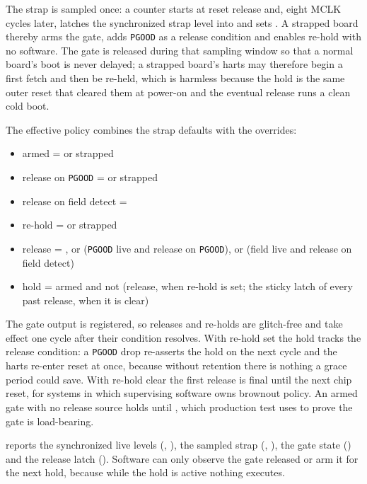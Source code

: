 The strap is sampled once: a counter starts at reset release and, eight MCLK cycles later, latches the synchronized strap level into  and sets . A strapped board thereby arms the gate, adds \texttt{PGOOD} as a release condition and enables re-hold with no software. The gate is released during that sampling window so that a normal board's boot is never delayed; a strapped board's harts may therefore begin a first fetch and then be re-held, which is harmless because the hold is the same outer reset that cleared them at power-on and the eventual release runs a clean cold boot.

The effective policy combines the strap defaults with the  overrides:
\begin{itemize}
	\item armed =  or strapped
	\item release on \texttt{PGOOD} =  or strapped
	\item release on field detect = 
	\item re-hold =  or strapped
	\item release = , or (\texttt{PGOOD} live and release on \texttt{PGOOD}), or (field live and release on field detect)
	\item hold = armed and not (release, when re-hold is set; the sticky latch of every past release, when it is clear)
\end{itemize}
The gate output is registered, so releases and re-holds are glitch-free and take effect one cycle after their condition resolves. With re-hold set the hold tracks the release condition: a \texttt{PGOOD} drop re-asserts the hold on the next cycle and the harts re-enter reset at once, because without retention there is nothing a grace period could save. With re-hold clear the first release is final until the next chip reset, for systems in which supervising software owns brownout policy. An armed gate with no release source holds until , which production test uses to prove the gate is load-bearing.

 reports the synchronized live levels (, ), the sampled strap (, ), the gate state () and the release latch (). Software can only observe the gate released or arm it for the next hold, because while the hold is active nothing executes.


